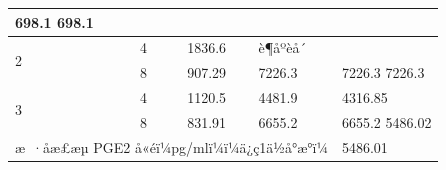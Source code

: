 \documentclass[UTF8,10pt,a4paper,fontset=fandol]{ctexart}
\newcommand{\fieldvalue}[1]{#1}
\newcommand{\handwritten}[1]{#1}
\begin{document}
\begin{tabularx}{\textwidth}{|p{}|p{}|p{}|p{}|p{}|X|}
\fieldvalue{\handwritten{698.1}} \quad
\fieldvalue{\handwritten{698.1}}\\
\hline
\multirow{2}{*}{2} &
\fieldvalue{\handwritten{4}} &
&
\fieldvalue{\handwritten{1836.6}} &
\fieldvalue{\handwritten{è¶åºèå´}} &
\\
\cline{2-6}
&
\fieldvalue{\handwritten{8}} &
&
\fieldvalue{\handwritten{907.29}} &
\fieldvalue{\handwritten{7226.3}} &
\fieldvalue{\handwritten{7226.3}} \quad
\fieldvalue{\handwritten{7226.3}}\\
\hline
\multirow{2}{*}{3} &
\fieldvalue{\handwritten{4}} &
&
\fieldvalue{\handwritten{1120.5}} &
\fieldvalue{\handwritten{4481.9}} &
\fieldvalue{\handwritten{4316.85}}\\
\cline{2-6}
&
\fieldvalue{\handwritten{8}} &
&
\fieldvalue{\handwritten{831.91}} &
\fieldvalue{\handwritten{6655.2}} &
\fieldvalue{\handwritten{6655.2}} \quad
\fieldvalue{\handwritten{5486.02}}\\
\hline
\multicolumn{5}{|l|}{æ ·åæ£æµ PGE2 å«éï¼pg/mlï¼ï¼ä¿ç1ä½å°æ°ï¼} &
\fieldvalue{\handwritten{5486.01}}\\
\hline
\end{tabularx}
\end{document}
